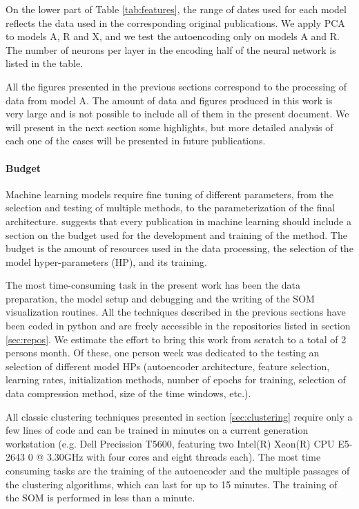 On the lower part of Table \ref{tab:features}, the range of dates used for each model reflects the data used in the corresponding original publications. We apply PCA to models A, R and X, and we test the autoencoding only on models A and R. The number of neurons per layer in the encoding half of the neural network is listed in the table.

All the figures presented in the previous sections correspond to the processing of data from model A. The amount of data and figures produced in this work is very large and is not possible to include all of them in the present document. We will present in the next section some highlights, but more detailed analysis of each one of the cases will be presented in future publications.

\paragraph{Budget}
Machine learning models require fine tuning of different parameters, from the selection and testing of multiple methods, to the parameterization of the final architecture. \citep{Dodge2019} suggests that every publication in machine learning should include a section on the budget used for the development and training of the method. The budget is the amount of resources used in the data processing, the selection of the model hyper-parameters (HP), and its training.

The most time-consuming task in the present work has been the data preparation, the model setup and debugging and the writing of the SOM visualization routines. All the techniques described in the previous sections have been coded in python and are freely accessible in the repositories listed in section \ref{sec:repos}. We estimate the effort to bring this work from scratch to a total of 2 persons month. Of these, one person week was dedicated to the testing an selection of different model HPs (autoencoder architecture, feature selection, learning rates, initialization methods, number of epochs for training, selection of data compression method, size of the time windows, etc.).

All classic clustering techniques presented in section \ref{sec:clustering} require only a few lines of code and can be trained in minutes on a current generation workstation (e.g. Dell Precission T5600, featuring two Intel(R) Xeon(R) CPU E5-2643 0 @ 3.30GHz with four cores and eight threads each). The most time consuming tasks are the training of the autoencoder and the multiple passages of the clustering algorithms, which can last for up to 15 minutes. The training of the SOM is performed in less than a minute.

